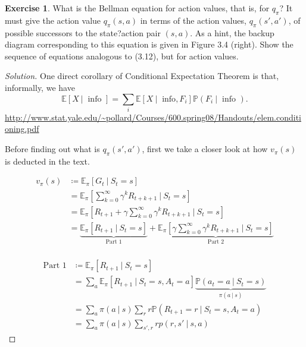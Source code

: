 \documentclass[oneside,11pt]{article}
\theoremstyle{definition}
\newtheorem{exer}[thm]{Exercise}
\newcommand{\PP}{\mathbb{P}}
\newcommand{\EE}{\mathbb{E}}
\newcommand{\Scal}{\mathcal{S}}
\newcommand{\vpi}{v_{\pi}}
\newcommand\givenbase[1][]{\:#1\lvert\:}
\let\given\givenbase
\newenvironment{solution}
{\renewcommand\qedsymbol{$\blacksquare$}\begin{proof}[Solution]} {\end{proof}}
\begin{document}
\begin{exer}
What is the Bellman equation for action values, that is, for $q_{\pi}$? It must give the action value $q_{\pi}(s,a)$ in terms of the action values, $q_{\pi}(s',a')$, of possible successors to the state?action pair $(s,a)$. As a hint, the backup diagram corresponding to this equation is given in Figure 3.4 (right). Show the sequence of equations analogous to (3.12), but for action values.
\end{exer}

\begin{shaded}
\begin{solution} 
One direct corollary of Conditional Expectation Theorem is that, informally, we have 
\[ \EE [X \given \text{~info~}] = \sum_i \EE [X \given \text{~info},F_i] \PP(F_i \given \text{~info~}). \]
 \url{http://www.stat.yale.edu/~pollard/Courses/600.spring08/Handouts/elem.conditioning.pdf}

Before finding out what is $q_{\pi}(s',a')$, first we take a closer look at how $v_{\pi}(s)$ is deducted in the text. 

\begin{equation*} %
\begin{split}
\vpi(s) & \coloneqq  \EE_{\pi}\left [G_t \given S_t = s \right ] \\
& = \EE_{\pi} \left [ \sum\limits_{k = 0}^{\infty} \gamma^k R_{t + k +1} \given S_t = s \right ]\\
& = \EE_{\pi} \left [ R_{t+1} + \gamma \sum\limits_{k = 0}^{\infty} \gamma^k R_{t + k +1} \given S_t = s \right ]\\
& = \underbrace{\EE_{\pi} \left [ R_{t+1}\given S_t = s \right ]}_{\text{Part 1}} +  \underbrace{\EE_{\pi} \left [ \gamma \sum\limits_{k = 0}^{\infty} \gamma^k R_{t + k +1} \given S_t = s \right ]}_{\text{Part 2}}\\
\end{split}
\end{equation*}

\begin{equation*} %
\begin{split}
\text{Part 1} & \coloneqq  \EE_{\pi} \left [ R_{t+1}\given S_t = s \right ] \\
& = \sum_a \EE_{\pi} \left [ R_{t+1}\given S_t = s, A_t = a \right ] \underbrace{\PP(a_t = a \given S_t = s)}_{\pi(a \given s)} \\
& = \sum_a \pi(a \given s) \sum_r r \PP(R_{t+1} = r \given S_t = s, A_t = a) \\
& = \sum_a \pi(a \given s) \sum_{s', r} r p(r,s' \given s,a) 
\end{split}
\end{equation*}



\end{solution}
\end{shaded}
\end{document}
